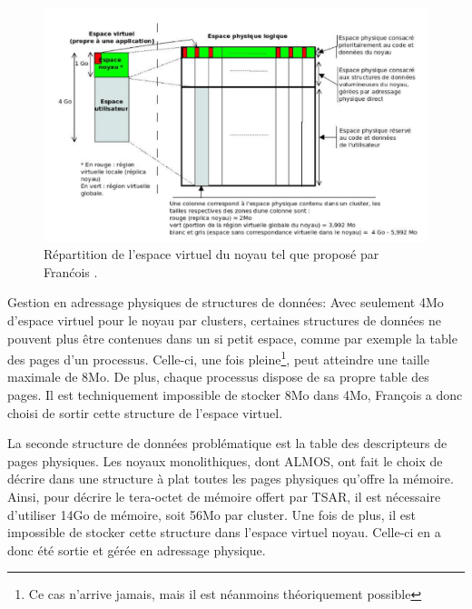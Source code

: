       \begin{figure}[ht]
        \centering \includegraphics[scale=0.3]{include/img/almos-guerret}
        \caption{Répartition de l'espace virtuel du noyau tel que proposé par
          Franćois \citet{guerret2014exploitation}.}
        \label{fig:almos-guerret}
      \end{figure}

      \begin{paragraph}{Gestion en adressage physiques de structures de données:}
        Avec seulement 4Mo d'espace virtuel pour le noyau par clusters,
        certaines structures de données ne pouvent plus être contenues dans un
        si petit espace, comme par exemple la table des pages d'un
        processus. Celle-ci, une fois pleine\footnote{Ce cas n'arrive jamais,
          mais il est néanmoins théoriquement possible}, peut atteindre une
        taille maximale de 8Mo. De plus, chaque processus dispose de sa propre
        table des pages. Il est techniquement impossible de stocker 8Mo dans
        4Mo, François a donc choisi de sortir cette structure de l'espace
        virtuel.

        La seconde structure de données problématique est la table des
        descripteurs de pages physiques. Les noyaux monolithiques, dont ALMOS,
        ont fait le choix de décrire dans une structure à plat toutes les pages
        physiques qu'offre la mémoire. Ainsi, pour décrire le tera-octet de
        mémoire offert par TSAR, il est nécessaire d'utiliser 14Go de mémoire,
        soit 56Mo par cluster. Une fois de plus, il est impossible de stocker
        cette structure dans l'espace virtuel noyau. Celle-ci en a donc été
        sortie et gérée en adressage physique.
      \end{paragraph}

